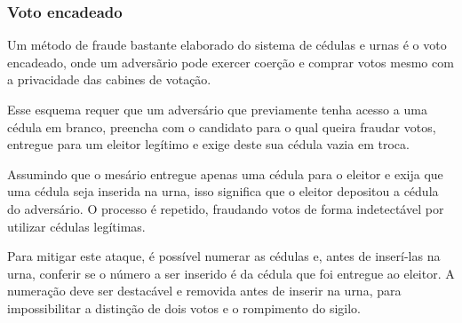 \subsubsection{Voto encadeado}

Um método de fraude bastante elaborado do sistema de cédulas e urnas é o voto
encadeado, onde um adversãrio pode exercer coerção e comprar votos mesmo com a
privacidade das cabines de votação.

Esse esquema requer que um adversário que previamente tenha acesso a uma cédula
em branco, preencha com o candidato para o qual queira fraudar votos, entregue
para um eleitor legítimo e exige deste sua cédula vazia em troca.

Assumindo que o mesário entregue apenas uma cédula para o eleitor e exija que
uma cédula seja inserida na urna, isso significa que o eleitor depositou a
cédula do adversário. O processo é repetido, fraudando votos de forma
indetectável por utilizar cédulas legítimas.

Para mitigar este ataque, é possível numerar as cédulas e, antes de inserí-las
na urna, conferir se o número a ser inserido é da cédula que foi entregue ao
eleitor. A numeração deve ser destacável e removida antes de inserir na urna,
para impossibilitar a distinção de dois votos e o rompimento do sigilo.
